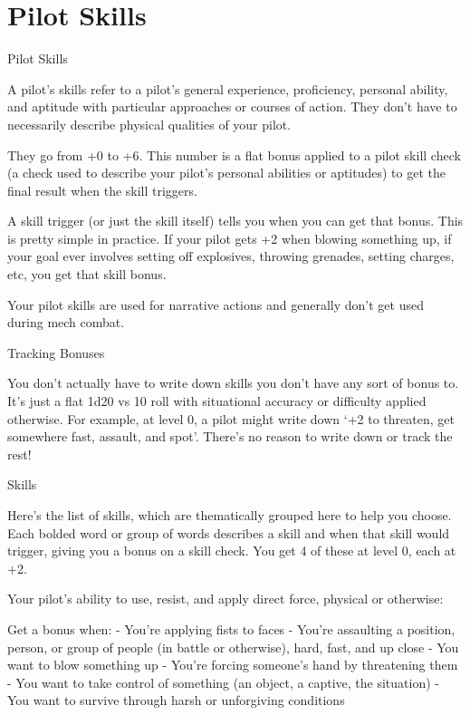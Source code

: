 \chapter{Pilot Skills}

                                                   Pilot Skills

A pilot’s skills refer to a pilot’s general experience, proficiency, personal ability, and aptitude with
particular approaches or courses of action. They don’t have to necessarily describe physical
qualities of your pilot.

They go from +0 to +6. This number is a flat bonus applied to a pilot skill check (a check used to
describe your pilot’s personal abilities or aptitudes) to get the final result when the skill triggers.

A skill trigger (or just the skill itself) tells you when you can get that bonus. This is pretty simple in
practice. If your pilot gets +2 when blowing something up, if your goal ever involves setting off
explosives, throwing grenades, setting charges, etc, you get that skill bonus.

Your pilot skills are used for narrative actions and generally don’t get used during mech combat.

                                                Tracking Bonuses


You don’t actually have to write down skills you don’t have any sort of bonus to. It’s just a flat
1d20 vs 10 roll with situational accuracy or difficulty applied otherwise. For example, at level 0, a
pilot might write down ‘+2 to threaten, get somewhere fast, assault, and spot’. There’s no reason
to write down or track the rest!


                                                        Skills

Here’s the list of skills, which are thematically grouped here to help you choose. Each bolded
word or group of words describes a skill and when that skill would trigger, giving you a bonus on a
skill check. You get 4 of these at level 0, each at +2.

Your pilot’s ability to use, resist, and apply direct force, physical or otherwise:

Get a bonus when:
          - You’re applying fists to faces
          - You’re assaulting a position, person, or group of people (in battle or otherwise), hard,
         fast, and up close
          - You want to blow something up
          - You’re forcing someone’s hand by threatening them
          - You want to take control of something (an object, a captive, the situation)
          - You want to survive through harsh or unforgiving conditions

